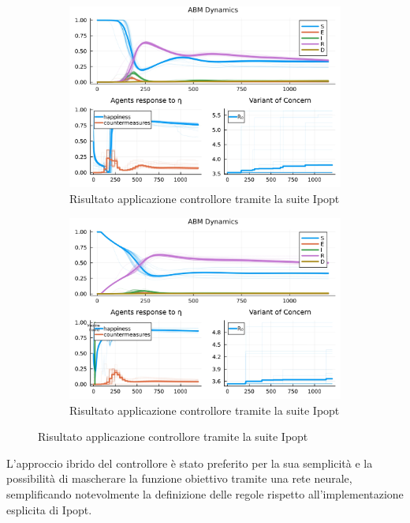 \begin{figure}[!hb]
	\centering
	\begin{subfigure}[b]{\textwidth}
		\centering
		\includegraphics[width=\textwidth]{img/SocialNetworkABM_IPOPT_CONTROL.jpg}
		\caption{Risultato applicazione controllore tramite la suite Ipopt}
		\label{fig:ipopt_res1}
	\end{subfigure}
	\hfill
	\begin{subfigure}[b]{\textwidth}
		\centering
		\includegraphics[width=\textwidth]{img/SocialNetworkABM_IPOPT_ALL.jpg}
		\caption{Risultato applicazione controllore tramite la suite Ipopt}
		\label{fig:ipopt_res2}
	\end{subfigure}
\end{figure}

L'approccio ibrido del controllore è stato preferito per la sua 
semplicità e la possibilità di mascherare la funzione obiettivo 
tramite una rete neurale, semplificando notevolmente la definizione 
delle regole rispetto all'implementazione esplicita di Ipopt.